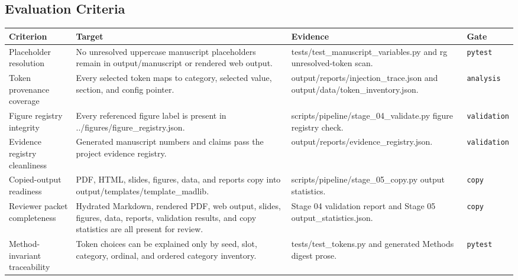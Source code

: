 \documentclass[
  english,
]{article}
\newcounter{none} %
\begin{document}
\subsection{Evaluation Criteria}\label{evaluation-criteria}

{\def\LTcaptype{none} %
\begin{longtable}[]{@{}
  >{\raggedright\arraybackslash}p{}
  >{\raggedright\arraybackslash}p{}
  >{\raggedright\arraybackslash}p{}
  >{\raggedright\arraybackslash}p{}@{}}
\toprule\noalign{}
\begin{minipage}[b]{\linewidth}\raggedright
Criterion
\end{minipage} & \begin{minipage}[b]{\linewidth}\raggedright
Target
\end{minipage} & \begin{minipage}[b]{\linewidth}\raggedright
Evidence
\end{minipage} & \begin{minipage}[b]{\linewidth}\raggedright
Gate
\end{minipage} \\
\midrule\noalign{}
\endhead
\bottomrule\noalign{}
\endlastfoot
Placeholder resolution & No unresolved uppercase manuscript placeholders
remain in output/manuscript or rendered web output. &
tests/test\_manuscript\_variables.py and rg unresolved-token scan. &
\texttt{pytest} \\
Token provenance coverage & Every selected token maps to category,
selected value, section, and config pointer. &
output/reports/injection\_trace.json and
output/data/token\_inventory.json. & \texttt{analysis} \\
Figure registry integrity & Every referenced figure label is present in
../figures/figure\_registry.json. &
scripts/pipeline/stage\_04\_validate.py figure registry check. &
\texttt{validation} \\
Evidence registry cleanliness & Generated manuscript numbers and claims
pass the project evidence registry. &
output/reports/evidence\_registry.json. & \texttt{validation} \\
Copied-output readiness & PDF, HTML, slides, figures, data, and reports
copy into output/templates/template\_madlib. &
scripts/pipeline/stage\_05\_copy.py output statistics. &
\texttt{copy} \\
Reviewer packet completeness & Hydrated Markdown, rendered PDF, web
output, slides, figures, data, reports, validation results, and copy
statistics are all present for review. & Stage 04 validation report and
Stage 05 output\_statistics.json. & \texttt{copy} \\
Method-invariant traceability & Token choices can be explained only by
seed, slot, category, ordinal, and ordered category inventory. &
tests/test\_tokens.py and generated Methods digest prose. &
\texttt{pytest} \\
\end{longtable}
}
\end{document}
